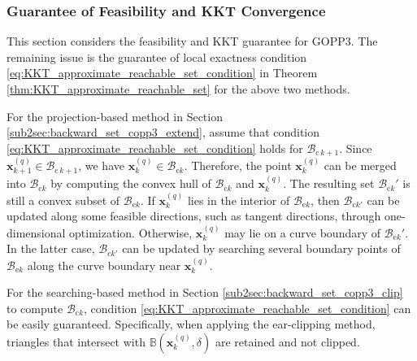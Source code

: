 \documentclass[journal]{IEEEtran}
\theoremstyle{definition}
\theoremstyle{definition}
\renewcommand\vector[1]{\boldsymbol{#1}}
\newcommand\vx{{\vector{x}}}
\begin{document}
\subsubsection{Guarantee of Feasibility and KKT Convergence} 

This section considers the feasibility and KKT guarantee for GOPP3. The remaining issue is the guarantee of local exactness condition \eqref{eq:KKT_approximate_reachable_set_condition} in Theorem \ref{thm:KKT_approximate_reachable_set} for the above two methods.

For the projection-based method in Section \ref{sub2sec:backward_set_copp3_extend}, assume that condition \eqref{eq:KKT_approximate_reachable_set_condition} holds for $\mathcal{B}_{\text{c}\,k+1}$. Since $\vx_{k+1}^{(q)}\in\mathcal{B}_{\text{c}\,k+1}$, we have $\vx_{k}^{(q)}\in\mathcal{B}_{\text{e}k}$. Therefore, the point $\vx_{k}^{(q)}$ can be merged into $\mathcal{B}_{\text{c}k}$ by computing the convex hull of $\mathcal{B}_{\text{c}k}$ and $\vx_{k}^{(q)}$. The resulting set $\mathcal{B}_{\text{c}k}'$ is still a convex subset of $\mathcal{B}_{\text{e}k}$. If $\vx_{k}^{(q)}$ lies in the interior of $\mathcal{B}_{\text{e}k}$, then $\mathcal{B}_{\text{c}k'}$ can be updated along some feasible directions, such as tangent directions, through one-dimensional optimization. Otherwise, $\vx_{k}^{(q)}$ may lie on a curve boundary of $\mathcal{B}_{\text{e}k}'$. In the latter case, $\mathcal{B}_{\text{c}k'}$ can be updated by searching several boundary points of $\mathcal{B}_{\text{e}k}$ along the curve boundary near $\vx_{k}^{(q)}$.

For the searching-based method in Section \ref{sub2sec:backward_set_copp3_clip} to compute $\mathcal{B}_{\text{c}k}$, condition \eqref{eq:KKT_approximate_reachable_set_condition} can be easily guaranteed. Specifically, when applying the ear-clipping method, triangles that intersect with $\mathbb{B}(\vx_k^{(q)},\delta)$ are retained and not clipped.
\end{document}
